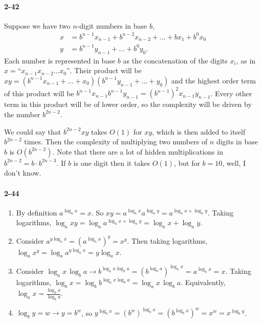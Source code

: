 \documentclass{report}
\begin{document}
\paragraph{2-42} Suppose we have two $n$-digit numbers in base $b$,
\begin{align*}
	x &= b^{n-1} x_{n-1} + b^{n-2} x_{n-2} + \ldots + b x_1 + b^0 x_0 \\
	y &= b^{n-1} y_{n-1} + \ldots + b^0 y_0.
\end{align*}
Each number is represented in base $b$ as the concatenation of the digits $x_i$, as in $x = \text{``}x_{n-1}x_{n-2}\ldots x_0\text{''}$. Their product will be $xy = (b^{n-1}x_{n-1} + \ldots + x_0)(b^{n-1} y_{n-1} + \ldots + y_0)$ and the highest order term of this product will be $b^{n-1} x_{n-1} b^{n-1} y_{n-1} = (b^{n-1})^2 x_{n-1}y_{n-1}$. Every other term in this product will be of lower order, so the complexity will be driven by the number $b^{2n-2}$.

We could say that $b^{2n-2} xy$ takes $O(1)$ for $xy$, which is then added to itself $b^{2n-2}$ times. Then the complexity of multiplying two numbers of $n$ digits in base $b$ is $O(b^{2n-2})$. Note that there are a lot of hidden multiplications in $b^{2n-2} = b\cdot b^{2n-3}$. If $b$ is one digit then it takes $O(1)$, but for $b=10$, well, I don't know.

\paragraph{2-44}
\begin{enumerate}[label=(\alph*)]
	\item By definition $a^{\log_a x} = x$. So $xy = a^{\log_a x} a^{\log_a y} = a^{\log_a x + \log_a y}$. Taking logarithms, $\log_a xy = \log_a a^{\log_a x + \log_a y} = \log_a x + \log_a y.$
	\item Consider $a^{y\log_a x} = \left(a^{\log_a x}\right)^y = x^y.$ Then taking logarithms, $\log_a x^y = \log_a a^{y\log_a x} = y\log_a x$.
	\item Consider $\log_a x\, \log_b a \rightarrow b^{\log_a x \log_b a} = \left(b^{\log_b a}\right)^{\log_a x} = a^{\log_a x} = x$. Taking logarithms, $\log_b x = \log_b b^{\log_a x \log_b a} = \log_a x\,\log_b a$. Equivalently, $\log_a x = \frac{\log_b x}{\log_b a}$.
	\item $\log_b y = w \rightarrow y = b^w$, so $y^{\log_b x} = \left(b^w\right)^{\log_b x} = \left(b^{\log_b x}\right)^w = x^w = x^{\log_b y}$.
\end{enumerate}
\end{document}
